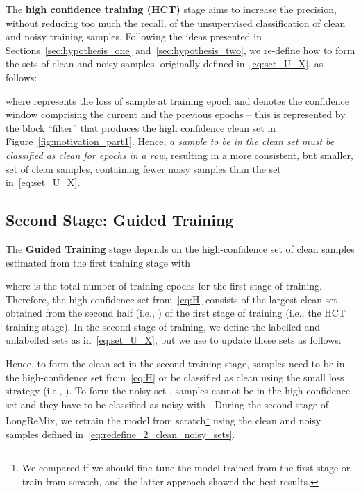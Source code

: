 \documentclass[review]{elsarticle}
\begin{document}
The \textbf{high confidence training (HCT)} stage aims to increase the precision, without reducing too much the recall, of the unsupervised classification of clean and noisy training samples.  
Following the ideas presented in Sections~\ref{sec:hypothesis_one} and~\ref{sec:hypothesis_two},
we re-define how to form the sets of clean and noisy samples, originally defined in~\eqref{eq:set_U_X}, as follows:

where  represents the loss of sample  at training epoch  and  denotes the confidence window comprising the current and the previous  epochs -- this is represented by the block ``filter''  that produces the high confidence clean set in Figure~\ref{fig:motivation_part1}.
Hence, \emph{a sample to be in the clean set  must be classified as clean for  epochs in a row}, resulting in a more consistent, but smaller, set of clean samples, containing fewer noisy samples than the set in~\eqref{eq:set_U_X}.




\subsection{Second Stage: Guided Training}
\label{sec:guided_training}

The \textbf{Guided Training} stage depends on the high-confidence set of clean samples estimated from the first training stage with

where  is the total number of training epochs for the first stage of training. 
Therefore, the high confidence set  from~\eqref{eq:H} consists of the largest clean set  obtained from the second half (i.e., ) of the first stage of training (i.e., the HCT training stage).
In the second stage of training, we define the labelled and unlabelled sets as in~\eqref{eq:set_U_X}, but we use  to update these sets as follows:

Hence, to form the clean set  in the second training stage, samples need to be in the high-confidence set  from~\eqref{eq:H} or be classified as clean using the small loss strategy (i.e., ).  To form the noisy set , samples cannot be in the high-confidence set  and they have to be classified as noisy with .
During the second stage of LongReMix, we retrain the model from scratch\footnote{We compared 
if we should fine-tune the model trained from the first stage or train from scratch, and the latter approach showed the best results.} using the
clean and noisy samples defined in~\eqref{eq:redefine_2_clean_noisy_sets}.
\end{document}
